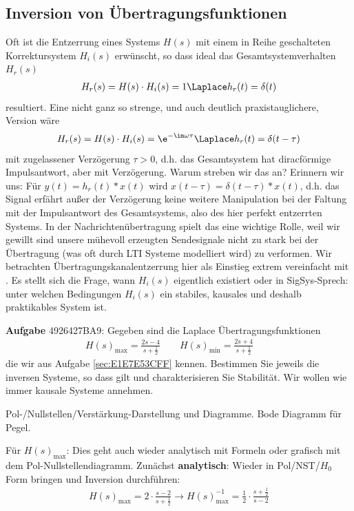 \newpage
\subsection{Inversion von Übertragungsfunktionen}
\label{sec:4926427BA9}
\begin{Ziel}
Oft ist die Entzerrung eines Systems $H(s)$ mit einem in Reihe
geschalteten Korrektursystem $H_i(s)$
erwünscht, so dass ideal das Gesamtsystemverhalten $H_r(s)$
\begin{align}
\label{eq:4926427BA9_EQing}
  H_r(s) = H(s)\cdot H_i(s) = 1 \Laplace h_r(t)=\delta(t)
\end{align}
resultiert.
Eine nicht ganz so strenge, und auch deutlich praxistauglichere, Version wäre
\begin{align}
  H_r(s) = H(s)\cdot H_i(s) = \e^{-\im\omega\tau} \Laplace h_r(t)=\delta(t-\tau)
\end{align}
mit zugelassener Verzögerung $\tau>0$, d.h. das Gesamtsystem hat diracförmige
Impulsantwort, aber mit Verzögerung. Warum streben wir das an? Erinnern wir uns:
Für $y(t) = h_r(t)\ast x(t)$ wird $x(t-\tau) = \delta(t-\tau)\ast x(t)$, d.h.
das Signal erfährt außer der Verzögerung keine weitere Manipulation bei der Faltung
mit der Impulsantwort des Gesamtsystems, also des hier perfekt entzerrten Systems.
In der Nachrichtenübertragung spielt das eine wichtige Rolle, weil wir
gewillt sind unsere mühevoll erzeugten Sendesignale nicht zu stark
bei der Übertragung (was oft durch LTI Systeme modelliert wird) zu verformen.
Wir betrachten Übertragungskanalentzerrung hier als Einstieg extrem vereinfacht mit
. Es stellt sich die Frage, wann $H_i(s)$ eigentlich
existiert oder in SigSys-Sprech: unter welchen Bedingungen $H_i(s)$
ein stabiles, kausales und deshalb praktikables System ist.
\end{Ziel}
\textbf{Aufgabe} {\tiny 4926427BA9}: Gegeben sind die Laplace
Übertragungsfunktionen
\begin{align}
H(s)_\mathrm{max} = \frac{2 s-4}{s+\frac{1}{2}}\qquad
H(s)_\mathrm{min} = \frac{2 s+4}{s+\frac{1}{2}}\qquad
\end{align}
die wir aus Aufgabe \ref{sec:E1E7E53CFF} kennen.
Bestimmen Sie jeweils die inversen Systeme, so dass  gilt
und charakterisieren Sie Stabilität. Wir wollen wie immer kausale Systeme annehmen.

\begin{Werkzeug}
Pol-/Nullstellen/Verstärkung-Darstellung und Diagramme. Bode Diagramm für Pegel.
\end{Werkzeug}
\begin{Ansatz}
Für $H(s)_\mathrm{max}$:
Dies geht auch wieder analytisch mit Formeln oder grafisch mit dem
Pol-Nullstellendiagramm.
Zunächst \textbf{analytisch}:
Wieder in Pol/NST/$H_0$ Form bringen und Inversion durchführen:
\begin{align}
H(s)_\mathrm{max} = 2\cdot\frac{s-2}{s+\frac{1}{2}}\rightarrow
H(s)_\mathrm{max}^{-1} = \frac{1}{2}\cdot\frac{s+\frac{1}{2}}{s-2}
\end{align}
\end{Ansatz}

